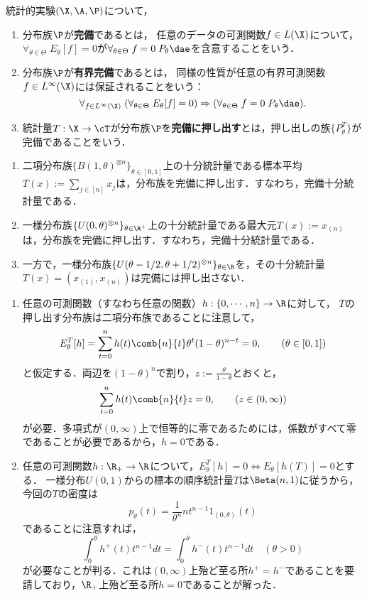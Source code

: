 \documentclass[uplatex,dvipdfmx]{jsreport}
\begin{document}
\begin{definition}
    統計的実験$(\X,\A,\P)$について，
    \begin{enumerate}
        \item 分布族$\P$が\textbf{完備}であるとは，
        任意のデータの可測関数$f\in L(\X)$について，$\forall_{\theta\in\Theta}\;E_\theta[f]=0$が$\forall_{\theta\in\Theta}\;f=0\;P_\theta\dae$を含意することをいう．
        \item 分布族$\P$が\textbf{有界完備}であるとは，
        同様の性質が任意の有界可測関数$f\in L^\infty(\X)$には保証されることをいう：
        \[\forall_{f\in L^\infty(\X)}\;(\forall_{\theta\in\Theta}\;E_\theta[f]=0)\Rightarrow (\forall_{\theta\in\Theta}\;f=0\;P_\theta\dae).\]
        \item 統計量$T:\X\to\cT$が分布族$\P$を\textbf{完備に押し出す}とは，押し出しの族$\{P^T_\theta\}$が完備であることをいう．
    \end{enumerate}
\end{definition}

\begin{example}[完備に押し出す統計量]\mbox{}
    \begin{enumerate}
        \item 二項分布族$\{B(1,\theta)^{\otimes n}\}_{\theta\in[0,1]}$上の十分統計量である標本平均$T(x):=\sum_{j\in[n]}x_j$は，分布族を完備に押し出す．すなわち，完備十分統計量である．
        \item 一様分布族$\{U(0,\theta)^{\otimes n}\}_{\theta\in\R^+}$上の十分統計量である最大元$T(x):=x_{(n)}$は，分布族を完備に押し出す．すなわち，完備十分統計量である．
        \item 一方で，一様分布族$\{U(\theta-1/2,\theta+1/2)^{\otimes n}\}_{\theta\in\R}$を，その十分統計量$T(x)=(x_{(1)},x_{(n)})$は完備には押し出さない．
    \end{enumerate}
\end{example}
\begin{Proof}\mbox{}
    \begin{enumerate}
        \item 任意の可測関数（すなわち任意の関数）$h:\{0,\cdots,n\}\to\R$に対して，
        $T$の押し出す分布族は二項分布族であることに注意して，
        \[E_\theta^T[h]=\sum_{t=0}^nh(t)\comb{n}{t}\theta^t(1-\theta)^{n-t}=0,\qquad(\theta\in[0,1])\]
        と仮定する．両辺を$(1-\theta)^n$で割り，$z:=\frac{\theta}{1-\theta}$とおくと，
        \[\sum_{t=0}^nh(t)\comb{n}{t}z=0,\qquad(z\in(0,\infty))\]
        が必要．多項式が$(0,\infty)$上で恒等的に零であるためには，係数がすべて零であることが必要であるから，$h=0$である．
        \item 任意の可測関数$h:\R_+\to\R$について，$E^T_\theta[h]=0\Leftrightarrow E_\theta[h(T)]=0$とする．
        一様分布$U(0,1)$からの標本の順序統計量$T$は$\Beta(n,1)$に従うから，今回の$T$の密度は
        \[p_\theta(t)=\frac{1}{\theta^n}nt^{n-1}1_{(0,\theta)}(t)\]
        であることに注意すれば，
        \[\int^\theta_0h^+(t)t^{n-1}dt=\int^\theta_0h^-(t)t^{n-1}dt\quad(\theta>0)\]
        が必要なことが判る．これは$(0,\infty)$上殆ど至る所$h^+=h^-$であることを要請しており，$\R_+$上殆ど至る所$h=0$であることが解った．
    \end{enumerate}
\end{Proof}
\end{document}
